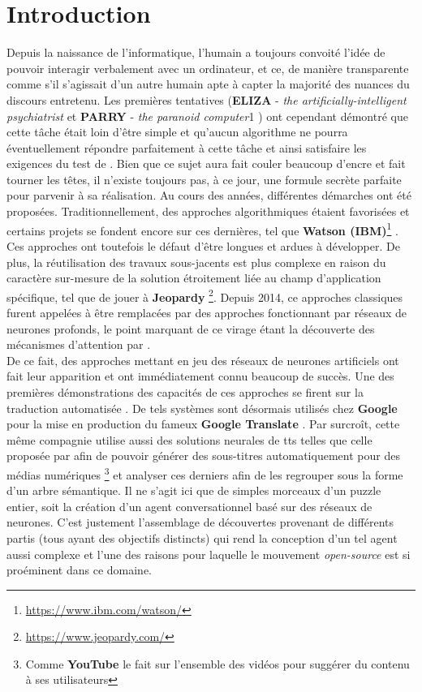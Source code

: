 \section{Introduction}

Depuis la naissance de l'informatique, l'humain a toujours convoité l'idée de pouvoir interagir verbalement avec un ordinateur, et ce, de manière transparente comme s'il s'agissait d'un autre humain apte à capter la majorité des nuances du discours entretenu. Les premières tentatives (\textbf{ELIZA} - \textit{the artificially-intelligent psychiatrist} \cite{elizaWeizenbaum} et \textbf{PARRY} - \textit{the paranoid computer}1 \cite{parryCerf}) ont cependant démontré que cette tâche était loin d'être simple et qu'aucun algorithme ne pourra éventuellement répondre parfaitement à cette tâche et ainsi satisfaire les exigences du test de \cite{turingTest}. Bien que ce sujet aura fait couler beaucoup d'encre et fait tourner les têtes, il n'existe toujours pas, à ce jour, une formule secrète parfaite pour parvenir à sa réalisation. Au cours des années, différentes démarches ont été proposées. Traditionnellement, des approches algorithmiques étaient favorisées et certains projets se fondent encore sur ces dernières, tel que \textbf{Watson (IBM)}\footnote{\url{https://www.ibm.com/watson/}} \cite{ibmWatson}. Ces approches ont toutefois le défaut d'être longues et ardues à développer. De plus, la réutilisation des travaux sous-jacents est plus complexe en raison du caractère sur-mesure de la solution étroitement liée au champ d'application spécifique, tel que de jouer à \textbf{Jeopardy} \footnote{\url{https://www.jeopardy.com/}}. Depuis 2014, ce approches classiques furent appelées à être remplacées par des approches fonctionnant par réseaux de neurones profonds, le point marquant de ce virage étant la découverte des mécanismes d'attention par \cite{attentionMechanism}. \\

De ce fait, des approches mettant en jeu des réseaux de neurones artificiels ont fait leur apparition et ont immédiatement connu beaucoup de succès. Une des premières démonstrations des capacités de ces approches se firent sur la traduction automatisée \cite{attentionMechanism}. De tels systèmes sont désormais utilisés chez \textbf{Google} pour la mise en production du fameux \textbf{Google Translate} \cite{googleTranslate}. Par surcroît, cette même compagnie utilise aussi des solutions neurales de \gls{tts} telles que celle proposée par \cite{acousticModeling} afin de pouvoir générer des sous-titres automatiquement pour des médias numériques \footnote{Comme \textbf{YouTube} le fait sur l'ensemble des vidéos pour suggérer du contenu à ses utilisateurs} et analyser ces derniers afin de les regrouper sous la forme d'un arbre sémantique. Il ne s'agit ici que de simples morceaux d'un puzzle entier, soit la création d'un agent conversationnel basé sur des réseaux de neurones. C'est justement l'assemblage de découvertes provenant de différents partis (tous ayant des objectifs distincts) qui rend la conception d'un tel agent aussi complexe et l'une des raisons pour laquelle le mouvement \textit{open-source} est si proéminent dans ce domaine. \\

